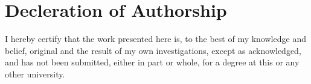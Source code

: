 \chapter*{Decleration of Authorship}

I hereby certify that the work presented here is, to the best of my knowledge and belief, original and the result of my own investigations, except as acknowledged, and has not been submitted, either in part or whole, for a degree at this or any other university.

\vspace{1cm}

\par\noindent\makebox[.6\textwidth]{\hrulefill} \hfill\makebox[.3\textwidth]{\hrulefill}

\par\noindent{}      
\hfill{}

